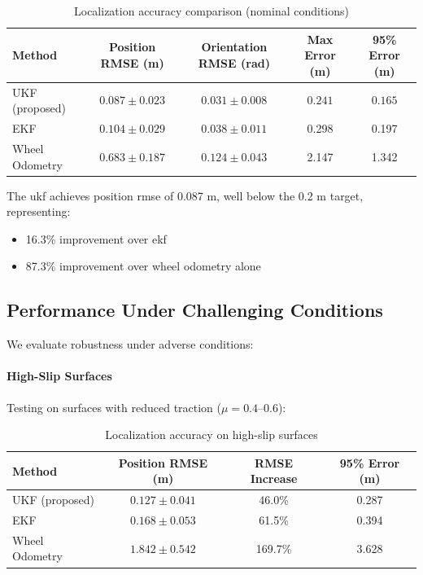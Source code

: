 \begin{table}[htbp]
\centering
\caption{Localization accuracy comparison (nominal conditions)}
\label{tab:localization_nominal}
\begin{tabular}{lcccc}
\toprule
\textbf{Method} & \textbf{Position RMSE (m)} & \textbf{Orientation RMSE (rad)} & \textbf{Max Error (m)} & \textbf{95\% Error (m)} \\
\midrule
UKF (proposed) & $\mathbf{0.087 \pm 0.023}$ & $\mathbf{0.031 \pm 0.008}$ & $\mathbf{0.241}$ & $\mathbf{0.165}$ \\
EKF & $0.104 \pm 0.029$ & $0.038 \pm 0.011$ & 0.298 & 0.197 \\
Wheel Odometry & $0.683 \pm 0.187$ & $0.124 \pm 0.043$ & 2.147 & 1.342 \\
\bottomrule
\end{tabular}
\end{table}

The \acrshort{ukf} achieves position \acrshort{rmse} of 0.087 m, well below the 0.2 m target, representing:
\begin{itemize}
    \item 16.3\% improvement over \acrshort{ekf}
    \item 87.3\% improvement over wheel odometry alone
\end{itemize}


\subsection{Performance Under Challenging Conditions}

We evaluate robustness under adverse conditions:

\paragraph{High-Slip Surfaces}
Testing on surfaces with reduced traction ($\mu = 0.4$--0.6):

\begin{table}[htbp]
\centering
\caption{Localization accuracy on high-slip surfaces}
\label{tab:localization_slip}
\begin{tabular}{lccc}
\toprule
\textbf{Method} & \textbf{Position RMSE (m)} & \textbf{RMSE Increase} & \textbf{95\% Error (m)} \\
\midrule
UKF (proposed) & $0.127 \pm 0.041$ & 46.0\% & 0.287 \\
EKF & $0.168 \pm 0.053$ & 61.5\% & 0.394 \\
Wheel Odometry & $1.842 \pm 0.542$ & 169.7\% & 3.628 \\
\bottomrule
\end{tabular}
\end{table}

